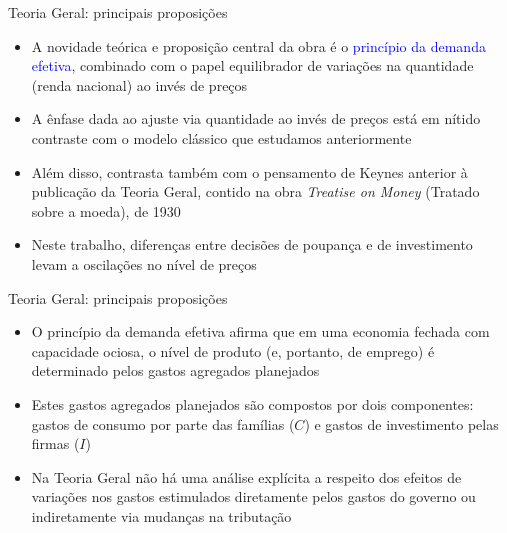 \documentclass[10pt]{beamer}
\begin{document}
\begin{frame}{Teoria Geral: principais proposições}
    \begin{itemize}
        \item A novidade teórica e proposição central da obra é o \textcolor{blue}{princípio da demanda efetiva}, combinado com o papel equilibrador de variações na quantidade (renda nacional) ao invés de preços
        \bigskip
        \item A ênfase dada ao ajuste via quantidade ao invés de preços está em nítido contraste com o modelo clássico que estudamos anteriormente
        \bigskip
        \item Além disso, contrasta também com o pensamento de Keynes anterior à publicação da Teoria Geral, contido na obra \emph{Treatise on Money} (Tratado sobre a moeda), de 1930
        \bigskip
        \item Neste trabalho, diferenças entre decisões de poupança e de investimento levam a oscilações no nível de preços
    \end{itemize}
\end{frame}

\begin{frame}{Teoria Geral: principais proposições}
    \begin{itemize}
        \item O princípio da demanda efetiva afirma que em uma economia fechada com capacidade ociosa, o nível de produto (e, portanto, de emprego) é determinado pelos gastos agregados planejados
        \bigskip
        \item Estes gastos agregados planejados são compostos por dois componentes: gastos de consumo por parte das famílias ($C$) e gastos de investimento pelas firmas ($I$)
        \bigskip
        \item Na Teoria Geral não há uma análise explícita a respeito dos efeitos de variações nos gastos estimulados diretamente pelos gastos do governo ou indiretamente via mudanças na tributação
    \end{itemize}
\end{frame}
\end{document}

